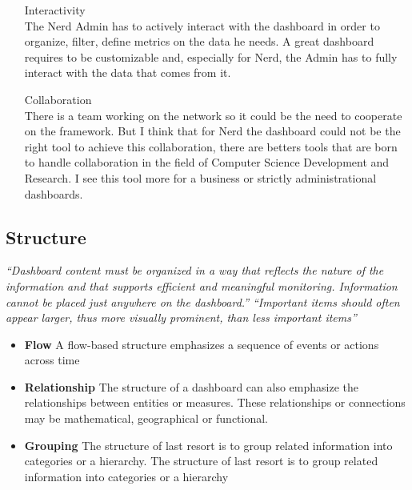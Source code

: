 \documentclass[a4paper,12pt]{report}
\begin{document}
\begin{itemize}
\item[Interactivity] \hfill \\ 
The Nerd Admin has to actively interact with the dashboard in order to organize, filter, define metrics on the data he needs. A great dashboard requires to be customizable and, especially for Nerd, the Admin has to fully interact with the data that comes from it.
\item[Collaboration] \hfill \\
There is a team working on the network so it could be the need to cooperate on the framework. But I think that for Nerd the dashboard could not be the right tool to achieve this collaboration, there are betters tools that are born to handle collaboration in the field of Computer Science Development and Research. 
I see this tool more for a business or strictly administrational dashboards.
\end{itemize}
\subsection{Structure}
\emph{``Dashboard content must be organized in a way that reflects the nature of the information and that supports efficient and meaningful monitoring. Information cannot be placed just anywhere on the dashboard.''}\newline
\emph{``Important items should often appear larger, thus more visually prominent, than less important items''}

\begin{itemize}
    \item \textbf{Flow}\newline
    A flow-based structure emphasizes a sequence of events or actions across time
    \item \textbf{Relationship}\newline
    The structure of a dashboard can also emphasize the relationships between entities or measures. These relationships or connections may be mathematical, geographical or functional.
    \item \textbf{Grouping}\newline
    The structure of last resort is to group related information into categories or a hierarchy. The structure of last resort is to group related information into categories or a hierarchy
\end{itemize}
\end{document}
